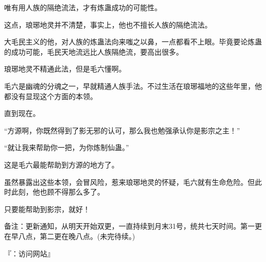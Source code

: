 \begin{this_body}
唯有用人族的隔绝流法，才有炼蛊成功的可能性。

这点，琅琊地灵并不清楚，事实上，他也不擅长人族的隔绝流法。

大毛民主义的他，对人族的炼蛊法向来嗤之以鼻，一点都看不上眼。毕竟要论炼蛊的成功可能，毛民天地流远比人族隔绝流，要高出很多。

琅琊地灵不精通此法，但是毛六懂啊。

毛六是幽魂的分魂之一，早就精通人族手法。不过生活在琅琊福地的这些年里，他都没有显现这个方面的本领。

直到现在。

“方源啊，你既然得到了影无邪的认可，那么我也勉强承认你是影宗之主！”

“就让我来帮助你一把，为你炼制仙蛊。”

这是毛六最能帮助到方源的地方了。

虽然暴露出这些本领，会冒风险，惹来琅琊地灵的怀疑，毛六就有生命危险。但此时此刻，他也顾不得那么多了。

只要能帮助到影宗，就好！

备注：更新通知，从明天开始双更，一直持续到月末31号，统共七天时间。第一更在早八点，第二更在晚八点。(未完待续。)

『：访问网站』

\end{this_body}

